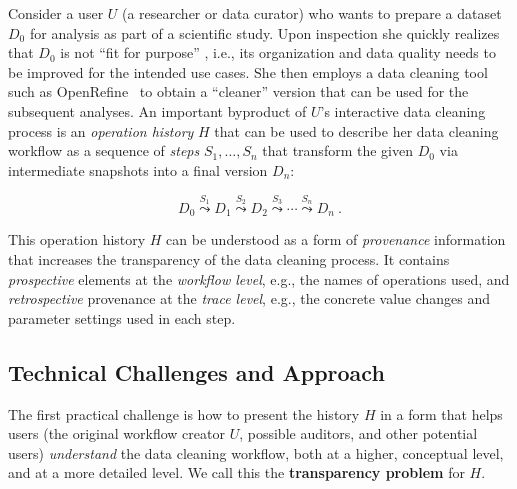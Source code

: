 \documentclass[conference]{ijdc-v14}
\newcommand{\openrefine}{\textrm{OpenRefine}\xspace}
\begin{document}
Consider a user $U$ (a researcher or data curator) who wants to prepare a dataset $D_0$ for
analysis as part of a scientific study. Upon inspection she quickly realizes that $D_0$ is not ``fit
for purpose'' \cite{chapman2020developing}, i.e., its organization and data quality needs to be
improved for the intended use cases. She then employs a data cleaning tool such as
\openrefine~\cite{openrefine2020} to obtain a ``cleaner'' version that can be used for the subsequent analyses.
An important byproduct of $U$'s interactive data cleaning process is an \emph{operation history} $H$
that can be used to describe her data cleaning workflow as a sequence of \emph{steps}
$S_1,\dots, S_n$ that transform the given $D_0$ via intermediate snapshots  into a final version
$D_n$: 

\begin{equation}
  D_0 \stackrel{S_1}{\leadsto} D_1 \stackrel{S_2}{\leadsto} D_2 \stackrel{S_3}{\leadsto} \cdots
  \stackrel{S_n}{\leadsto}  D_n ~. \label{eq-wf-history} \tag{$H$}
 \end{equation}

 This operation history $H$ can be understood as a form of \emph{provenance} information that increases
 the transparency of the data cleaning process. It contains \emph{prospective} elements at the
 \emph{workflow level}, e.g., the names of operations used, and \emph{retrospective} provenance at
 the \emph{trace level}, e.g., the concrete value changes and parameter settings used in each step.

\subsection{Technical Challenges and Approach}

The first practical challenge is how to present the history $H$ in a form that helps users (the
original workflow creator $U$, possible auditors, and other potential users) \emph{understand}
the data cleaning workflow, both at a higher, conceptual level, and at a more detailed level. We
call this the \textbf{transparency problem} for $H$.
\end{document}
